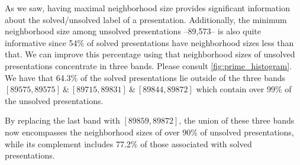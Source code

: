 
As we saw, having maximal neighborhood size provides significant information about the solved/unsolved label of a presentation.
Additionally, the minimum neighborhood size among unsolved presentations --89,573-- is also quite informative since 54\% of solved presentations have neighborhood sizes less than that.
We can improve this percentage using that neighborhood sizes of unsolved presentations concentrate in three bands.
Please consult \cref{fig:prime_histogram}.
We have that 64.3\% of the solved presentations lie outside of the three bands $[89575, 89575]\ \& \ [89715, 89831]\ \& \ [89844, 89872]$ which contain over 99\% of the unsolved presentations.

By replacing the last band with $[89859,89872]$, the union of these three bands now encompasses the neighborhood sizes of over 90\% of unsolved presentations, while its complement includes 77.2\% of those associated with solved presentations.

